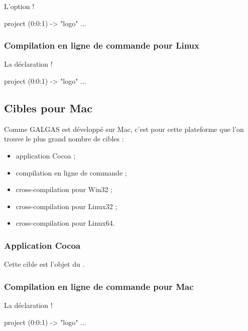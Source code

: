 L'option \ggs!%
\begin{galgas}
project (0:0:1) -> "logo" {
  ...
}
\end{galgas}

\subsubsection{Compilation en ligne de commande pour Linux}

La déclaration \ggs!%
\begin{galgas}
project (0:0:1) -> "logo" {
  ...
}
\end{galgas}



\subsection{Cibles pour Mac}

Comme GALGAS est développé sur Mac, c'est pour cette plateforme que l'on trouve le plus grand nombre de cibles :
\begin{itemize}
  \item application Cocoa ;
  \item compilation en ligne de commande ;
  \item cross-compilation pour Win32 ;
  \item cross-compilation pour Linux32 ;
  \item cross-compilation pour Linux64.
\end{itemize}

\subsubsection{Application Cocoa}

Cette cible est l'objet du .

\subsubsection{Compilation en ligne de commande pour Mac}

La déclaration \ggs!%
\begin{galgas}
project (0:0:1) -> "logo" {
  ...
}
\end{galgas}


